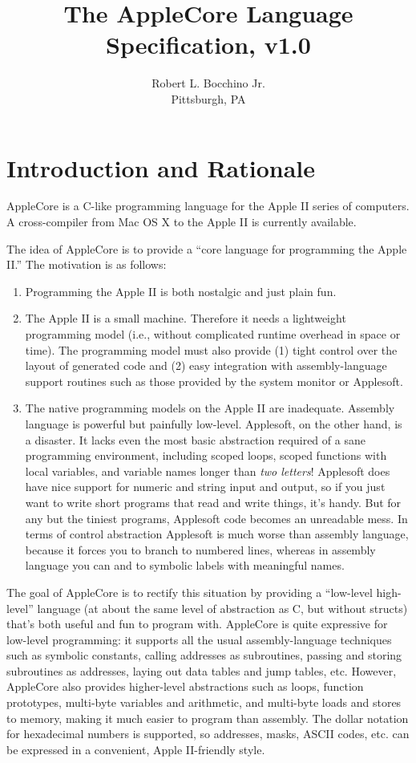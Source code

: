 \documentclass[10pt]{article}
\title{\bfseries{The AppleCore Language Specification, v1.0}}
\author{Robert L. Bocchino Jr.\\
Pittsburgh, PA}
\begin{document}
\maketitle

\tableofcontents

\section{Introduction and Rationale}

AppleCore is a C-like programming language for the Apple II series of
computers.  A cross-compiler from Mac OS X to the Apple II is
currently available.

The idea of AppleCore is to provide a ``core language for programming
the Apple II.''  The motivation is as follows:
%
\begin{enumerate}
%
\item Programming the Apple II is both nostalgic and just plain fun.
%
\item The Apple II is a small machine.  Therefore it needs a
  lightweight programming model (i.e., without complicated runtime
  overhead in space or time).  The programming model must also provide
  (1) tight control over the layout of generated code and (2) easy
  integration with assembly-language support routines such as those
  provided by the system monitor or Applesoft.
%
\item The native programming models on the Apple II are inadequate.
  Assembly language is powerful but painfully low-level.  Applesoft,
  on the other hand, is a disaster.  It lacks even the most basic
  abstraction required of a sane programming environment, including
  scoped loops, scoped functions with local variables, and variable
  names longer than \emph{two letters}!  Applesoft does have nice
  support for numeric and string input and output, so if you just want
  to write short programs that read and write things, it's handy. But
  for any but the tiniest programs, Applesoft code becomes an
  unreadable mess.  In terms of control abstraction Applesoft is much
  worse than assembly language, because it forces you to branch to
  numbered lines, whereas in assembly language you can  and
   to symbolic labels with meaningful names.
%
\end{enumerate}

The goal of AppleCore is to rectify this situation by providing a
``low-level high-level'' language (at about the same level of
abstraction as C, but without structs) that's both useful and fun to
program with.  AppleCore is quite expressive for low-level
programming: it supports all the usual assembly-language techniques
such as symbolic constants, calling addresses as subroutines, passing
and storing subroutines as addresses, laying out data tables and jump
tables, etc.  However, AppleCore also provides higher-level
abstractions such as loops, function prototypes, multi-byte variables
and arithmetic, and multi-byte loads and stores to memory, making it
much easier to program than assembly.  The dollar notation for
hexadecimal numbers is supported, so addresses, masks, ASCII codes,
etc. can be expressed in a convenient, Apple II-friendly style.
\end{document}
